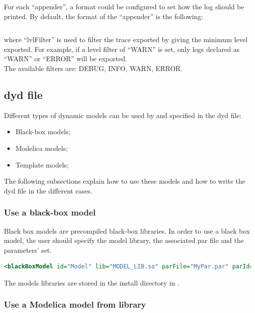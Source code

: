 \documentclass[a4paper, 12pt]{report}
\begin{document}
\begin{itemize}
For each ``appender'', a format could be configured to set how the log should be printed. By default, the format of the ``appender'' is the following:
\begin{lstlisting}[numbers=none]
%Y-%m-%d %H:%M:%S | <lvlFilter> | log
\end{lstlisting}

where ``lvlFilter'' is used to filter the trace exported by giving the minimum level exported. For example, if a level filter of ``WARN'' is set, only logs declared as ``WARN'' or ``ERROR'' will be exported. \\

The available filters are: DEBUG, INFO, WARN, ERROR.
\end{itemize}

\subsection{dyd file}

Different types of dynamic models can be used by \Dynawo and specified in the dyd file:
\begin{itemize}
\item Black-box models;
\item Modelica models;
\item Template models;
\end{itemize}

The following subsections explain how to use these models and how to write the dyd file in the different cases.

\subsubsection{Use a black-box model}

Black box models are precompiled black-box libraries. In order to use a black box model, the user should specify the model library, the associated par file and the parameters' set.
\begin{lstlisting}[language=XML, morekeywords={lib},numbers=none]
<blackBoxModel id="Model" lib="MODEL_LIB.so" parFile="MyPar.par" parId="5">
\end{lstlisting}

The models libraries are stored in the install directory in .

\subsubsection[Use a Modelica model from Dynawo library]{Use a Modelica model from \Dynawo library}
\end{document}
